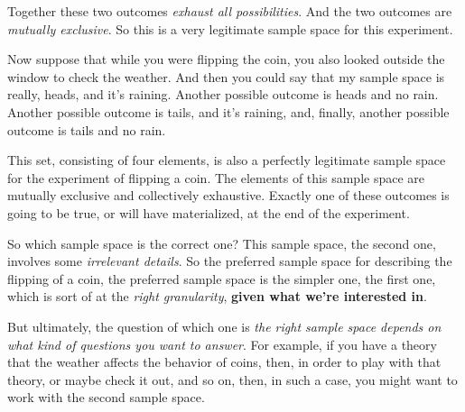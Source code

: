 \documentclass[pdftex, brazil, 12pt, twoside]{article}
\begin{document}
Together these two outcomes \emph{exhaust all possibilities}.
And the two outcomes are \emph{mutually exclusive}.
So this is a very legitimate sample space for this
experiment.

Now suppose that while you were flipping the coin, you
also looked outside the window to check the weather.
And then you could say that my sample space is really, heads,
and it's raining.
Another possible outcome is heads and no rain.
Another possible outcome is tails, and it's raining, and,
finally, another possible outcome is tails and no rain.

\begin{figure}[H]
  \begin{center}
  \end{center}
\end{figure}

This set, consisting of four elements, is also a perfectly
legitimate sample space for the experiment
of flipping a coin.
The elements of this sample space are mutually exclusive
and collectively exhaustive.
Exactly one of these outcomes is going to be true, or will
have materialized, at the end of the experiment.

So which sample space is the correct one?
This sample space, the second one, involves
some \emph{irrelevant details}.
So the preferred sample space for describing the flipping of
a coin, the preferred sample space is the simpler one, the
first one, which is sort of at the \emph{right granularity}, \textbf{given
  what we're interested in}.

But ultimately, the question of which one is \emph{the right
sample space depends on what kind of
questions you want to answer}.
For example, if you have a theory that the weather
affects the behavior of coins, then, in order to play with
that theory, or maybe check it out, and so on, then, in such
a case, you might want to work with the second sample space.
\end{document}
